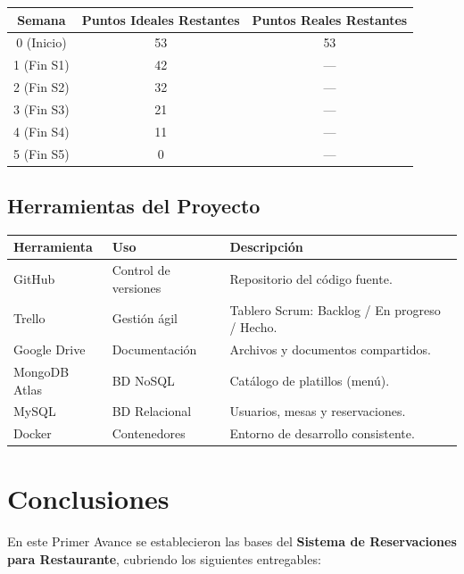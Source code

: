 \documentclass[12pt,a4paper]{article}
\begin{document}
\begin{center}
\begin{tabular}{ccc}
\toprule
\rowcolor{grisclaro}
\textbf{Semana} & \textbf{Puntos Ideales Restantes} & \textbf{Puntos Reales Restantes} \\
\midrule
0 (Inicio) & 53 & 53 \\
1 (Fin S1) & 42 & --- \\
2 (Fin S2) & 32 & --- \\
3 (Fin S3) & 21 & --- \\
4 (Fin S4) & 11 & --- \\
5 (Fin S5) &  0 & --- \\
\bottomrule
\end{tabular}
\end{center}

\subsection{Herramientas del Proyecto}

\begin{center}
{\small
\begin{tabular}{llp{6cm}}
\toprule
\rowcolor{grisclaro}
\textbf{Herramienta} & \textbf{Uso} & \textbf{Descripción} \\
\midrule
GitHub        & Control de versiones & Repositorio del código fuente. \\
Trello        & Gestión ágil         & Tablero Scrum: Backlog / En progreso / Hecho. \\
Google Drive  & Documentación        & Archivos y documentos compartidos. \\
MongoDB Atlas & BD NoSQL             & Catálogo de platillos (menú). \\
MySQL         & BD Relacional        & Usuarios, mesas y reservaciones. \\
Docker        & Contenedores         & Entorno de desarrollo consistente. \\
\bottomrule
\end{tabular}}
\end{center}

\section{Conclusiones}

En este Primer Avance se establecieron las bases del \textbf{Sistema de Reservaciones
para Restaurante}, cubriendo los siguientes entregables:
\end{document}
